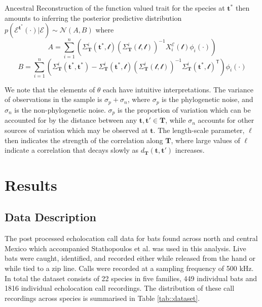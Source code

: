 \documentclass{ws-rv9x6}
\begin{document}
Ancestral Reconstruction of the function valued trait for the species at \(\mathbf{t}^*\) then amounts to inferring the posterior predictive distribution \(p(\mathcal{E}^{\mathbf{t}^*} (\cdot) | \mathcal{E}) \sim \mathcal{N}(A, B)\) where 
\begin{equation}
A = \sum_{i=1}^{n} \left( \Sigma_{\mathbf{T}}^i(\mathbf{t}^*, \mathcal{t}) \left( \Sigma_{\mathbf{T}}^i(\mathcal{t}, \mathcal{t})
\right)^{-1} X_i^{\mathcal{E}} (\mathcal{t}) \phi_i(\cdot) \right)
\label{eqn:postmean}
\end{equation}
\begin{equation}
B = \sum_{i=1}^{n}\left( \Sigma_{\mathbf{T}}^i(\mathbf{t}^*, \mathbf{t}^*) -  \Sigma_{\mathbf{T}}^i(\mathbf{t}^*, \mathcal{t}) \left( \Sigma_{\mathbf{T}}^i(\mathcal{t}, \mathcal{t})
\right)^{-1} \Sigma_{\mathbf{T}}^i(\mathbf{t}^*, \mathcal{t})^{\mathsf{T}} \right) \phi_i (\cdot)
\label{eqn:postvar}
\end{equation}

We note that the elements of \(\theta\) each have intuitive interpretations. The variance of observations in the sample is \(\sigma_p + \sigma_n\), where \(\sigma_p\) is the phylogenetic noise, and \(\sigma_n\) is the non-phylogenetic noise. \(\sigma_p\) is the proportion of variation which can be accounted for by the distance between any \(\mathbf{t}, \mathbf{t}' \in \mathbf{T}\), while \(\sigma_n\) accounts for other sources of variation which may be observed at \(\mathbf{t}\). The length-scale parameter, \(\ell\) then indicates the strength of the correlation along \(\mathbf{T}\), where large values of \(\ell\) indicate a correlation that decays slowly as \(d_{\mathbf{T}}(\mathbf{t}, \mathbf{t}')\) increases. 

\section{Results}

\subsection{Data Description}

The post processed echolocation call data for bats found across north and central Mexico which accompanied Stathopoulos et al. \cite{stathopoulos2017bat} was used in this analysis. Live bats were caught, identified, and recorded either while released from the hand or while tied to a zip line. Calls were recorded at a sampling frequency of 500 kHz. 
In total the dataset consists of 22 species in five families, 449 individual bats and 1816 individual echolocation call recordings. The distribution of these call recordings across species is summarised in Table \ref{tab::dataset}.
\end{document}
